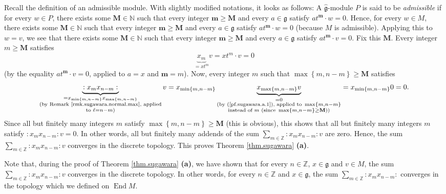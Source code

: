 \documentclass[etingof-lie.tex]{subfiles}
\begin{document}
Recall the definition of an admissible module. With slightly modified
notations, it looks as follows: A $\widehat{\mathfrak{g}}$-module $P$ is said
to be \textit{admissible} if for every $w\in P$, there exists some
$\mathbf{M}\in\mathbb{N}$ such that every integer $\mathbf{m}\geq\mathbf{M}$
and every $a\in\mathfrak{g}$ satisfy $at^{\mathbf{m}}\cdot w=0$. Hence, for
every $w\in M$, there exists some $\mathbf{M}\in\mathbb{N}$ such that every
integer $\mathbf{m}\geq\mathbf{M}$ and every $a\in\mathfrak{g}$ satisfy
$at^{\mathbf{m}}\cdot w=0$ (because $M$ is admissible). Applying this to
$w=v$, we see that there exists some $\mathbf{M}\in\mathbb{N}$ such that every
integer $\mathbf{m}\geq\mathbf{M}$ and every $a\in\mathfrak{g}$ satisfy
$at^{\mathbf{m}}\cdot v=0$. Fix this $\mathbf{M}$. Every integer
$m\geq\mathbf{M}$ satisfies%
\begin{equation}
\underbrace{x_{m}}_{=xt^{m}}v=xt^{m}\cdot v=0 \label{pf.sugawara.a.1}%
\end{equation}
(by the equality $at^{\mathbf{m}}\cdot v=0$, applied to $a=x$ and
$\mathbf{m}=m$). Now, every integer $m$ such that $\max\left\{  m,n-m\right\}
\geq\mathbf{M}$ satisfies%
\[
\underbrace{\left.  :x_{m}x_{n-m}:\right.  }_{\substack{=x_{\min\left\{
m,n-m\right\}  }x_{\max\left\{  m,n-m\right\}  }\\\text{(by Remark
\ref{rmk.sugawara.normal.max}, applied}\\\text{to }\ell=n-m\text{)}}%
}v=x_{\min\left\{  m,n-m\right\}  }\underbrace{x_{\max\left\{  m,n-m\right\}
}v}_{\substack{=0\\\text{(by (\ref{pf.sugawara.a.1}), applied to }\max\left\{
m,n-m\right\}  \\\text{instead of }m\text{ (since }\max\left\{  m,n-m\right\}
\geq\mathbf{M}\text{))}}}=x_{\min\left\{  m,n-m\right\}  }0=0.
\]
Since all but finitely many integers $m$ satisfy $\max\left\{  m,n-m\right\}
\geq\mathbf{M}$ (this is obvious), this shows that all but finitely many
integers $m$ satisfy $\left.  :x_{m}x_{n-m}:\right.  v=0$. In other words, all
but finitely many addends of the sum $\sum\limits_{m\in\mathbb{Z}}\left.
:x_{m}x_{n-m}:\right.  v$ are zero. Hence, the sum $\sum\limits_{m\in
\mathbb{Z}}\left.  :x_{m}x_{n-m}:\right.  v$ converges in the discrete
topology. This proves Theorem \ref{thm.sugawara} \textbf{(a)}.

Note that, during the proof of Theorem \ref{thm.sugawara} \textbf{(a)}, we
have shown that for every $n\in\mathbb{Z}$, $x\in\mathfrak{g}$ and $v\in M$,
the sum $\sum\limits_{m\in\mathbb{Z}}\left.  :x_{m}x_{n-m}:\right.  v$
converges in the discrete topology. In other words, for every $n\in\mathbb{Z}$
and $x\in\mathfrak{g}$, the sum $\sum\limits_{m\in\mathbb{Z}}\left.
:x_{m}x_{n-m}:\right.  $ converges in the topology which we defined on
$\operatorname*{End}M$.
\end{document}
